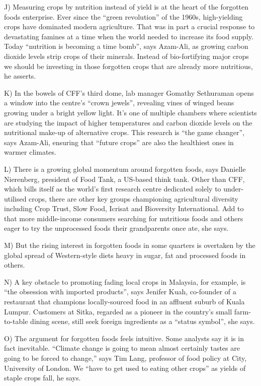 \documentclass[UTF8,11pt]{ctexart}
\begin{document}
J) Measuring crops by nutrition instead of yield is at the heart of the forgotten foods enterprise. Ever since the “green revolution” of the 1960s, high-yielding crops have dominated modern agriculture. That was in part a crucial response to devastating famines at a time when the world needed to increase its food supply. Today “nutrition is becoming a time bomb”, says Azam-Ali, as growing carbon dioxide levels strip crops of their minerals. Instead of bio-fortifying major crops we should be investing in those forgotten crops that are already more nutritious, he asserts.


K) In the bowels of CFF’s third dome, lab manager Gomathy Sethuraman opens a window into the centre’s “crown jewels”, revealing vines of winged beans growing under a bright yellow light. It’s one of multiple chambers where scientists are studying the impact of higher temperatures and carbon dioxide levels on the nutritional make-up of alternative crops. This research is “the game changer”, says Azam-Ali, ensuring that “future crops” are also the healthiest ones in warmer climates.


L) There is a growing global momentum around forgotten foods, says Danielle Nierenberg, president of Food Tank, a US-based think tank. Other than CFF, which bills itself as the world’s first research centre dedicated solely to under-utilised crops, there are other key groups championing agricultural diversity including Crop Trust, Slow Food, Icrisat and Bioversity International. Add to that more middle-income consumers searching for nutritious foods and others eager to try the unprocessed foods their grandparents once ate, she says.


M) But the rising interest in forgotten foods in some quarters is overtaken by the global spread of Western-style diets heavy in sugar, fat and processed foods in others.


N) A key obstacle to promoting fading local crops in Malaysia, for example, is “the obsession with imported products”, says Jenifer Kuah, co-founder of a restaurant that champions locally-sourced food in an affluent suburb of Kuala Lumpur. Customers at Sitka, regarded as a pioneer in the country’s small farm-to-table dining scene, still seek foreign ingredients as a “status symbol”, she says.


O) The argument for forgotten foods feels intuitive. Some analysts say it is in fact inevitable. “Climate change is going to mean almost certainly tastes are going to be forced to change,” says Tim Lang, professor of food policy at City, University of London. We “have to get used to eating other crops” as yields of staple crops fall, he says.
\end{document}
